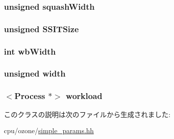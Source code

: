 \label{classSimpleParams_a38c8af5392da70119dc5cce4e3637cbc}
\hypertarget{classSimpleParams_a2bfc819c212cc4fda248fe12fbba68b8}{
\subsubsection[{squashWidth}]{\setlength{\rightskip}{0pt plus 5cm}unsigned {\bf squashWidth}}}
\label{classSimpleParams_a2bfc819c212cc4fda248fe12fbba68b8}
\hypertarget{classSimpleParams_aa7b18ffebeef8540109bf838e4550405}{
\subsubsection[{SSITSize}]{\setlength{\rightskip}{0pt plus 5cm}unsigned {\bf SSITSize}}}
\label{classSimpleParams_aa7b18ffebeef8540109bf838e4550405}
\hypertarget{classSimpleParams_a20d3086e6bcdc826d99143ac7c9b23a4}{
\subsubsection[{wbWidth}]{\setlength{\rightskip}{0pt plus 5cm}int {\bf wbWidth}}}
\label{classSimpleParams_a20d3086e6bcdc826d99143ac7c9b23a4}
\hypertarget{classSimpleParams_a7fa72fbc1c4226b0615406b9d8f540ed}{
\subsubsection[{width}]{\setlength{\rightskip}{0pt plus 5cm}unsigned {\bf width}}}
\label{classSimpleParams_a7fa72fbc1c4226b0615406b9d8f540ed}
\hypertarget{classSimpleParams_a432242e16e8a636661bec6d50b3501a5}{
\subsubsection[{workload}]{$<${\bf Process} $\ast$$>$ {\bf workload}}}
\label{classSimpleParams_a432242e16e8a636661bec6d50b3501a5}


このクラスの説明は次のファイルから生成されました:\begin{DoxyCompactItemize}
\item 
cpu/ozone/\hyperlink{simple__params_8hh}{simple\_\-params.hh}\end{DoxyCompactItemize}
